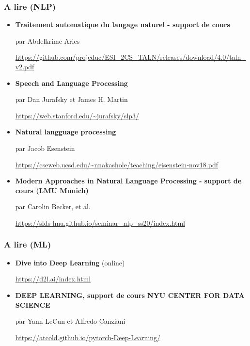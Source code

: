\documentclass{beamer}
\begin{document}
\begin{frame}
	\frametitle{A lire (NLP)}
	
	\begin{itemize}
		
		\item \textbf{Traitement automatique du langage naturel - support de cours}
		
		par Abdelkrime Aries
		
		\url{https://github.com/projeduc/ESI_2CS_TALN/releases/download/4.0/taln_v2.pdf}
		
		
		\item \textbf{Speech and Language Processing} 
		
		par Dan Jurafsky et James H. Martin
		
		\url{https://web.stanford.edu/~jurafsky/slp3/}
		
		\item \textbf{Natural langguage processing}
		
		par Jacob Esenstein 
		
		\url{https://cseweb.ucsd.edu/~nnakashole/teaching/eisenstein-nov18.pdf}
		
		\item \textbf{Modern Approaches in Natural Language Processing - support de cours (LMU Munich)}
		
		par Carolin Becker, et al.
		
		\url{https://slds-lmu.github.io/seminar_nlp_ss20/index.html}
		
		
		
	\end{itemize}
	
\end{frame}

\begin{frame}
	\frametitle{A lire (ML)}
	
	\begin{itemize}
		
		
		\item \textbf{Dive into Deep Learning} (online)
		
		\url{https://d2l.ai/index.html}
		
		\item \textbf{DEEP LEARNING, support de cours NYU CENTER FOR DATA SCIENCE} 
		
		par Yann LeCun et  Alfredo Canziani
		
		\url{https://atcold.github.io/pytorch-Deep-Learning/}
		
		
	\end{itemize}
	
\end{frame}
\end{document}
